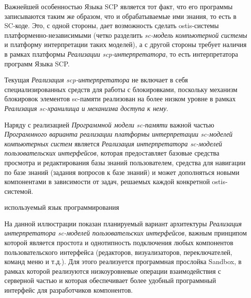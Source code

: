 \begin{scnitemize}
\begin{scnitemize}
Важнейшей особенностью Языка SCP является тот факт, что его программы записываются таким же образом, что и обрабатываемые
ими знания, то есть в SC-коде. Это, с одной стороны, дает возможность сделать ostis-системы платформенно-независимыми
(четко разделить \textit{sc-модель компьютерной системы} и платформу интерпретации таких моделей), а с другой стороны
требует наличия в рамках платформы \textit{Реализации scp-интерпретатора}, то есть интерпретатора программ Языка SCP.

Текущая \textit{Реализация scp-интерпретатора} не включает в себя специализированных средств для работы с блокировками,
поскольку механизм блокировок элементов sc-памяти реализован на более низком уровне в рамках \textit{Реализация
sc-хранилища и механизма доступа к нему}.

Наряду с реализацией \textit{Программной модели sc-памяти} важной частью \textit{Программного варианта реализации платформы
интерпретации sc-моделей компьютерных систем} является \textit{Реализация интерпретатора sc-моделей пользовательских
интерфейсов}, которая предоставляет базовые средства просмотра и редактирования базы знаний пользователем, средства для
навигации по базе знаний (задания вопросов к базе знаний) и может дополняться новыми компонентами в зависимости от задач,
решаемых каждой конкретной ostis-системой.

\begin{SCn}
\begin{scnrelfromlist}{используемый язык программирования}
\end{scnrelfromlist}
\end{SCn}

На данной иллюстрации показан планируемый вариант архитектуры \textit{Реализация интерпретатора sc-моделей пользовательских
интерфейсов}, важным принципом которой является простота и однотипность подключения любых компонентов пользовательского
интерфейса (редакторов, визуализаторов, переключателей, команд меню и т.д.). Для этого реализуется программная прослойка
Sandbox, в рамках которой реализуются низкоуровневые операции взаимодействия с серверной частью и которая обеспечивает
более удобный программный интерфейс для разработчиков компонентов.


\end{scnitemize}
\end{scnitemize}
